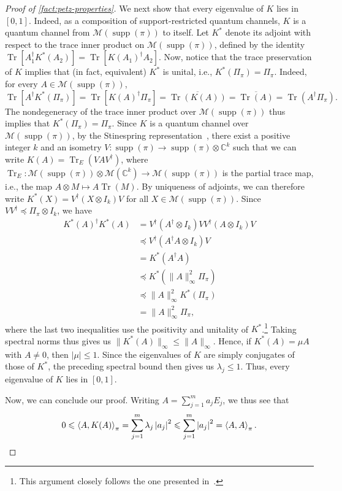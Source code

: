 \documentclass[11pt]{article}
\renewcommand{\leq}{\leqslant}
\theoremstyle{remark}
\newcommand{\cM}{\mathcal{M}}
\newcommand{\C}{\mathbb{C}}
\newcommand{\Tr}{\operatorname{Tr}}
\newcommand{\supp}{\operatorname{supp}}
\newcommand{\abs}[1]{\left|#1\right|}
\newcommand{\norm}[1]{\lVert#1\rVert}
\newcommand{\inner}[2]{\left\langle #1, #2\right\rangle}
\begin{document}
\begin{proof}[Proof of \cref{fact:petz-properties}]
We next show that every eigenvalue of $K$ lies in $[0,1]$. Indeed, as a composition of support-restricted quantum channels, $K$ is a quantum channel from $\cM(\supp(\pi))$ to itself. Let $K^*$ denote its adjoint with respect to the trace inner product on $\cM(\supp(\pi))$, defined by the identity $\Tr[A_1^\dagger K^*(A_2)] = \Tr[K(A_1)^\dagger A_2]$. Now, notice that the trace preservation of $K$ implies that (in fact, equivalent) $K^*$ is unital, i.e., $K^*(\Pi_\pi) = \Pi_\pi$. Indeed, for every $A \in \cM(\supp(\pi))$,
\begin{equation*}
\Tr\left[A^\dagger K^*(\Pi_\pi)\right]
= \Tr\left[K(A)^\dagger \Pi_\pi\right]
= \overline{\Tr(K(A))}
= \overline{\Tr(A)}
= \Tr(A^\dagger \Pi_\pi).
\end{equation*}
The nondegeneracy of the trace inner product over $\cM(\supp(\pi))$ thus implies that $K^*(\Pi_\pi) = \Pi_\pi$. Since $K$ is a quantum channel over $\cM(\supp(\pi))$, by the Stinespring representation~\cite[Chapter 8]{NC10}, there exist a positive integer $k$ and an isometry $V : \supp(\pi) \to \supp(\pi) \otimes \C^k$ such that we can write $K(A) = \Tr_E(V A V^\dagger)$, where $\Tr_E : \cM(\supp(\pi)) \otimes \cM(\C^k) \to \cM(\supp(\pi))$ is the partial trace map, i.e., the map $A \otimes M \mapsto A\Tr(M)$. By uniqueness of adjoints, we can therefore write $K^*(X)=V^\dagger(X \otimes I_k)V$ for all $X \in \cM(\supp(\pi))$. Since $VV^\dagger \preceq \Pi_\pi \otimes I_k$, we have
\begin{align*}
K^*(A)^\dagger K^*(A)
&= V^\dagger(A^\dagger \otimes I_k)VV^\dagger(A \otimes I_k)V \\
&\preceq V^\dagger(A^\dagger A \otimes I_k)V \\
&= K^*(A^\dagger A) \\
&\preceq K^*(\norm{A}_\infty^2\Pi_\pi) \\
&\preceq \norm{A}_\infty^2K^*(\Pi_\pi) \\
&= \norm{A}_\infty^2\Pi_\pi,
\end{align*}
where the last two inequalities use the positivity and unitality of $K^*$.\footnote{This argument closely follows the one presented in~\cite[Section~5.2, Equations~(5.2)--(5.3)]{Wol12}.} Taking spectral norms thus gives us $\norm{K^*(A)}_\infty \leq \norm{A}_\infty$. Hence, if $K^*(A) = \mu A$ with $A \neq 0$, then $|\mu| \leq 1$. Since the eigenvalues of $K$ are simply conjugates of those of $K^*$, the preceding spectral bound then gives us $\lambda_j \leq 1$. Thus, every eigenvalue of $K$ lies in $[0,1]$.

Now, we can conclude our proof. Writing $A = \sum_{j=1}^m{a_jE_j}$, we thus see that
\begin{equation*}
0 \leq \inner{A}{K(A)}_\pi
= \sum_{j = 1}^m{\lambda_j\abs{a_j}^2}
\leq \sum_{j = 1}^m{\abs{a_j}^2}
= \inner{A}{A}_\pi.\qedhere
\end{equation*}
\end{proof}
\end{document}
